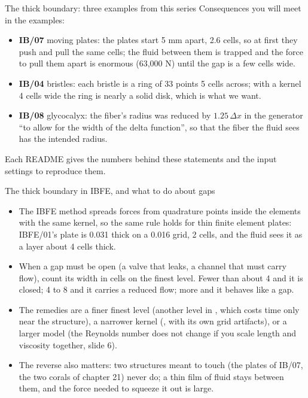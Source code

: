 \documentclass[aspectratio=169,11pt]{beamer}
\begin{document}
\begin{frame}{The thick boundary: three examples from this series}
Consequences you will meet in the examples:
\begin{itemize}
  \item \textbf{IB/07} moving plates: the plates start 5 mm apart, 2.6 cells, so at first they push and pull the same cells; the fluid between them is trapped and the force to pull them apart is enormous (63,000 N) until the gap is a few cells wide.
  \item \textbf{IB/04} bristles: each bristle is a ring of 33 points 5 cells across; with a kernel 4 cells wide the ring is nearly a solid disk, which is what we want.
  \item \textbf{IB/08} glycocalyx: the fiber's radius was reduced by $1.25\,\Delta x$ in the generator ``to allow for the width of the delta function'', so that the fiber the fluid sees has the intended radius.
\end{itemize}
\vspace{2mm}
\begin{punchbox}
\small Each README gives the numbers behind these statements and the input settings to reproduce them.
\end{punchbox}
\end{frame}

\begin{frame}{The thick boundary in IBFE, and what to do about gaps}
\begin{itemize}
  \item The IBFE method spreads forces from quadrature points inside the elements with the same kernel, so the same rule holds for thin finite element plates: IBFE/01's plate is 0.031 thick on a 0.016 grid, 2 cells, and the fluid sees it as a layer about 4 cells thick.
  \item When a gap must be open (a valve that leaks, a channel that must carry flow), count its width in cells on the finest level. Fewer than about 4 and it is closed; 4 to 8 and it carries a reduced flow; more and it behaves like a gap.
  \item The remedies are a finer finest level (another level in , which costs time only near the structure), a narrower kernel (, with its own grid artifacts), or a larger model (the Reynolds number does not change if you scale length and viscosity together, slide 6).
  \item The reverse also matters: two structures meant to touch (the plates of IB/07, the two corals of chapter 21) never do; a thin film of fluid stays between them, and the force needed to squeeze it out is large.
\end{itemize}
\end{frame}
\end{document}
